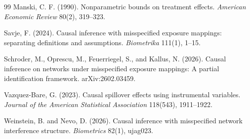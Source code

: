 \documentclass[11pt]{article}
\theoremstyle{definition}
\theoremstyle{plain}
\theoremstyle{remark}
\begin{document}
\begin{thebibliography}{99}
Manski, C. F. (1990).
Nonparametric bounds on treatment effects.
\emph{American Economic Review} 80(2), 319--323.

Savje, F. (2024).
Causal inference with misspecified exposure mappings: separating definitions and assumptions.
\emph{Biometrika} 111(1), 1--15.

Schroder, M., Oprescu, M., Feuerriegel, S., and Kallus, N. (2026).
Causal inference on networks under misspecified exposure mappings: A partial identification framework.
arXiv:2602.03459.

Vazquez-Bare, G. (2023).
Causal spillover effects using instrumental variables.
\emph{Journal of the American Statistical Association} 118(543), 1911--1922.

Weinstein, B. and Nevo, D. (2026).
Causal inference with misspecified network interference structure.
\emph{Biometrics} 82(1), ujag023.
\end{thebibliography}
\end{document}

